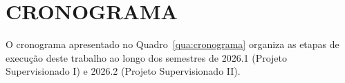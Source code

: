 %
%

\chapter{CRONOGRAMA}
\label{cap:cronograma}

O cronograma apresentado no Quadro~\ref{qua:cronograma} organiza as etapas de execução deste trabalho ao longo dos semestres de 2026.1 (Projeto Supervisionado I) e 2026.2 (Projeto Supervisionado II).

